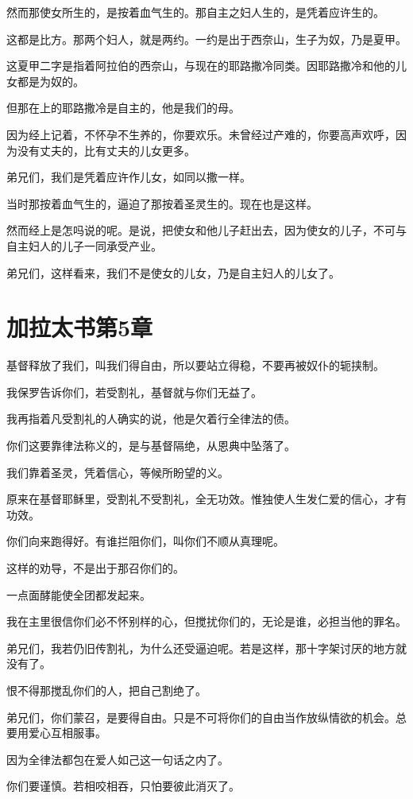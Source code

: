 \documentclass[12pt,oneside]{book}
\begin{document}
然而那使女所生的，是按着血气生的。那自主之妇人生的，是凭着应许生的。

这都是比方。那两个妇人，就是两约。一约是出于西奈山，生子为奴，乃是夏甲。

这夏甲二字是指着阿拉伯的西奈山，与现在的耶路撒冷同类。因耶路撒冷和他的儿女都是为奴的。

但那在上的耶路撒冷是自主的，他是我们的母。

因为经上记着，不怀孕不生养的，你要欢乐。未曾经过产难的，你要高声欢呼，因为没有丈夫的，比有丈夫的儿女更多。

弟兄们，我们是凭着应许作儿女，如同以撒一样。

当时那按着血气生的，逼迫了那按着圣灵生的。现在也是这样。

然而经上是怎吗说的呢。是说，把使女和他儿子赶出去，因为使女的儿子，不可与自主妇人的儿子一同承受产业。

弟兄们，这样看来，我们不是使女的儿女，乃是自主妇人的儿女了。

\chapter{加拉太书第5章}
基督释放了我们，叫我们得自由，所以要站立得稳，不要再被奴仆的轭挟制。

我保罗告诉你们，若受割礼，基督就与你们无益了。

我再指着凡受割礼的人确实的说，他是欠着行全律法的债。

你们这要靠律法称义的，是与基督隔绝，从恩典中坠落了。

我们靠着圣灵，凭着信心，等候所盼望的义。

原来在基督耶稣里，受割礼不受割礼，全无功效。惟独使人生发仁爱的信心，才有功效。

你们向来跑得好。有谁拦阻你们，叫你们不顺从真理呢。

这样的劝导，不是出于那召你们的。

一点面酵能使全团都发起来。

我在主里很信你们必不怀别样的心，但搅扰你们的，无论是谁，必担当他的罪名。

弟兄们，我若仍旧传割礼，为什么还受逼迫呢。若是这样，那十字架讨厌的地方就没有了。

恨不得那搅乱你们的人，把自己割绝了。

弟兄们，你们蒙召，是要得自由。只是不可将你们的自由当作放纵情欲的机会。总要用爱心互相服事。

因为全律法都包在爱人如己这一句话之内了。

你们要谨慎。若相咬相吞，只怕要彼此消灭了。
\end{document}
